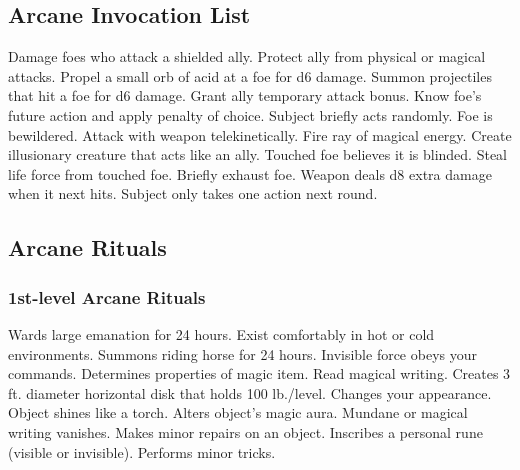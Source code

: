 \subsection{Arcane Invocation List}
\begin{swspelllist}
   Damage foes who attack a shielded ally.
   Protect ally from physical or magical attacks.
   Propel a small orb of acid at a foe for d6 damage.
   Summon projectiles that hit a foe for d6 damage.
   Grant ally temporary attack bonus.
   Know foe's future action and apply penalty of choice.
   Subject briefly acts randomly.
   Foe is bewildered.
   Attack with weapon telekinetically.
   Fire ray of magical energy.
   Create illusionary creature that acts like an ally.
   Touched foe believes it is blinded.
   Steal life force from touched foe.
   Briefly exhaust foe.
   Weapon deals d8 extra damage when it next hits.
   Subject only takes one action next round.
\end{swspelllist}

\subsection{Arcane Rituals}\label{Arcane Rituals}
\subsubsection{1st-level Arcane Rituals}
\begin{rituallist}
     Wards large emanation for 24 hours.
     Exist comfortably in hot or cold environments.
     Summons riding horse for 24 hours.
     Invisible force obeys your commands.
     Determines properties of magic item.
     Read magical writing.
     Creates 3 ft. diameter horizontal disk that holds 100 lb./level.
     Changes your appearance.
     Object shines like a torch.
     Alters object's magic aura.
     Mundane or magical writing vanishes.
     Makes minor repairs on an object.
     Inscribes a personal rune (visible or invisible).
     Performs minor tricks.
\end{rituallist}

